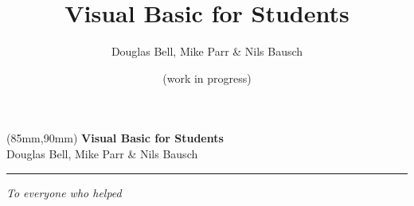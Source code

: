 \documentclass[twoside=off,10pt,a4paper,BCOR=0pt,DIV=8]{scrbook}
\begin{document}
\title{\sForget Visual Basic for Students}
\author{Douglas Bell, Mike Parr \& Nils Bausch}
\date{  (work in progress)}
\titlehead{}
\publishers{Published by Nils Bausch}





	\maketitle 

	\thispagestyle{empty}
	\null\newpage

	
	\thispagestyle{empty}
	\begin{textblock*}{80mm}(85mm,90mm)
	\noindent
	{\sffamily\LARGE\bfseries Visual Basic for Students}\\
	\noindent
		{\sffamily\small Douglas Bell, Mike Parr \& Nils Bausch}\\
	{\color{darkgray}\rule[5pt]{170pt}{3pt}}
	\end{textblock*}
	\null\newpage

	\thispagestyle{empty}
	

	\thispagestyle{empty}
	\null
	\vspace*{\fill}
	\hfill\textit{To everyone who helped}
	\vspace*{\fill}
	\newpage

	\thispagestyle{empty}
	\null\newpage


	\frontmatter 
	\tableofcontents 
	\listoffigures 
	\listoftables 


	
	



\mainmatter 



















%
%
%
%
%
%
%



\end{document}
